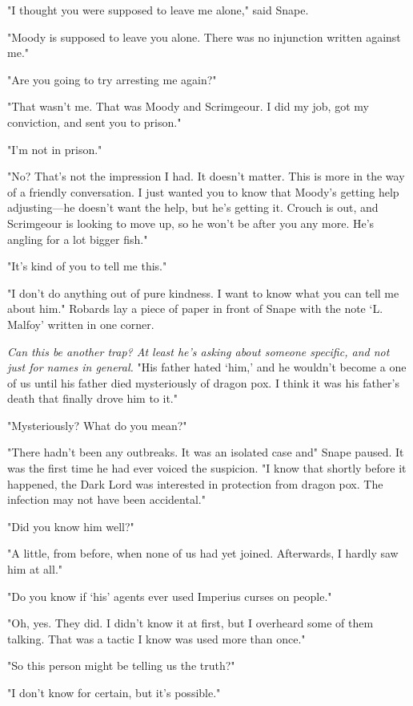 "I thought you were supposed to leave me alone," said Snape.

"Moody is supposed to leave you alone. There was no injunction written against me."

"Are you going to try arresting me again?"

"That wasn't me. That was Moody and Scrimgeour. I did my job, got my conviction, and sent you to prison."

"I'm not in prison."

"No? That's not the impression I had. It doesn't matter. This is more in the way of a friendly conversation. I just wanted you to know that Moody's getting help adjusting—he doesn't want the help, but he's getting it. Crouch is out, and Scrimgeour is looking to move up, so he won't be after you any more. He's angling for a lot bigger fish."

"It's kind of you to tell me this."

"I don't do anything out of pure kindness. I want to know what you can tell me about him." Robards lay a piece of paper in front of Snape with the note `L. Malfoy' written in one corner.

\emph{Can this be another trap? At least he's asking about someone specific, and not just for names in general.} "His father hated{\el} `him,' and he wouldn't become a{\el} one of us until his father died mysteriously of dragon pox. I think it was his father's death that finally drove him to it."

"Mysteriously? What do you mean?"

"There hadn't been any outbreaks. It was an isolated case and{\el}" Snape paused. It was the first time he had ever voiced the suspicion. "I know that shortly before it happened, the Dark Lord was interested in protection from dragon pox. The infection may not have been accidental."

"Did you know him well?"

"A little, from before, when none of us had yet joined. Afterwards, I hardly saw him at all."

"Do you know if{\el} `his' agents ever used Imperius curses on people."

"Oh, yes. They did. I didn't know it at first, but I overheard some of them talking. That was a tactic I know was used more than once."

"So this person might be telling us the truth?"

"I don't know for certain, but it's possible."

